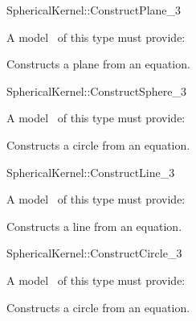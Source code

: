 
\begin{ccRefFunctionObjectConcept}{SphericalKernel::ConstructPlane_3}

\ccRefines


A model \ccVar\ of this type must provide:

{Constructs a plane from an equation.}

\ccSeeAlso


\end{ccRefFunctionObjectConcept}
\begin{ccRefFunctionObjectConcept}{SphericalKernel::ConstructSphere_3}

\ccRefines


A model \ccVar\ of this type must provide:

{Constructs a circle from an equation.}

\ccSeeAlso


\end{ccRefFunctionObjectConcept}
\begin{ccRefFunctionObjectConcept}{SphericalKernel::ConstructLine_3}

\ccRefines


A model \ccVar\ of this type must provide:

{Constructs a line from an equation.}

\ccSeeAlso


\end{ccRefFunctionObjectConcept}
\begin{ccRefFunctionObjectConcept}{SphericalKernel::ConstructCircle_3}

A model \ccVar\ of this type must provide:

{Constructs a circle from an equation.}

\ccSeeAlso


\end{ccRefFunctionObjectConcept}
